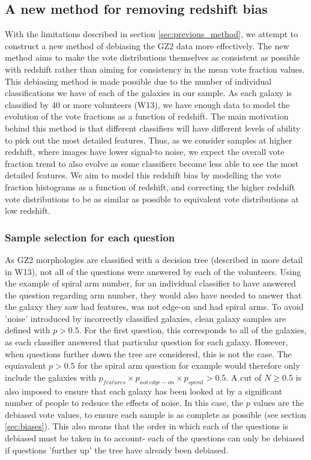 \documentclass[useAMS,usenatbib]{mn2e}
\begin{document}
\subsection{A new method for removing redshift bias}
\label{sec:new_method}

With the limitations described in section \ref{sec:previous_method}, we attempt to construct a new method of debiasing the GZ2 data more effectively. The new method aims to make the vote distributions themselves as consistent  as possible with redshift rather than aiming for consistency in the mean vote fraction values. This debiasing method is made possible due to the number of individual classifications we have of each of the galaxies in our sample. As each galaxy is classified by 40 or more volunteers (W13), we have enough data to model the evolution of the vote fractions as a function of redshift. The main motivation behind this method is that different classifiers will have different levels of ability to pick out the most detailed features. Thus, as we consider samples at higher redshift, where images have lower signal-to noise, we expect the overall vote fraction trend to also evolve as some classifiers become less able to see the most detailed features. We aim to model this redshift bias by modelling the vote fraction histograms as a function of redshift, and correcting the higher redshift vote distributions to be as similar as possible to equivalent vote distributions at low redshift.

\subsubsection{Sample selection for each question}

As GZ2 morphologies are classified with a decision tree (described in more detail in W13), not all of the questions were answered by each of the volunteers. Using the example of spiral arm number, for an individual classifier to have answered the question regarding arm number, they would also have needed to answer that the galaxy they saw had features, was not edge-on and had spiral arms. To avoid 'noise' introduced by incorrectly classified galaxies, clean galaxy samples are defined with $p > 0.5$. For the first question, this corresponds to all of the galaxies, as each classifier answered that particular question for each galaxy. However, when questions further down the tree are considered, this is not the case. The equiavalent $p>0.5$ for the spiral arm question for example would therefore only include the galaxies with $p_{features} \times p_{not \, edge-on} \times p_{spiral} > 0.5$. A cut of $N \geq 0.5$ is also imposed to ensure that each galaxy has been looked at by a significant number of people to redsuce the effects of noise. In this case, the $p$ values are the debiased vote values, to ensure each sample is as complete as possible (see section \ref{sec:biases}). This also means that the order in which each of the questions is debiased must be taken in to account- each of the questions can only be debiased if questions 'further up' the tree have already been debiased. 
\end{document}
